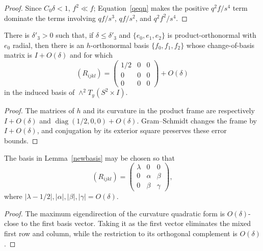 \begin{proof}
\sketch
Since $C_0\delta<1$, $f^2\ll f$; Equation~\eqref{qeqn} makes the positive
$q^2f/s^4$ term dominate the terms involving $qf/s^3$, $qf/s^2$, and
$q^2f^2/s^4$.
\end{proof}

\begin{lemma}
\label{lem:near-cylinder-curvature-eigenbasis}
\label{newbasis}
There is $\delta'_3>0$ such that, if $\delta\leq\delta'_3$ and
$\{e_0,e_1,e_2\}$ is product-orthonormal with $e_0$ radial, then there is an
$h$-orthonormal basis $\{f_0,f_1,f_2\}$ whose change-of-basis matrix is
$I+O(\delta)$ and for which
\[
  (R_{ijkl})=
  \begin{pmatrix}1/2&0&0\\0&0&0\\0&0&0\end{pmatrix}+O(\delta)
\]
in the induced basis of $\wedge^2T_y(S^2\times I)$.
\end{lemma}

\begin{proof}
\sketch
The matrices of $h$ and its curvature in the product frame are respectively
$I+O(\delta)$ and
$\operatorname{diag}(1/2,0,0)+O(\delta)$. Gram--Schmidt changes the frame by
$I+O(\delta)$, and conjugation by its exterior square preserves these error
bounds.
\end{proof}

\begin{corollary}
\label{cor:curvature-diagonal-block-basis}

\label{2ndnewbasis}
The basis in Lemma~\ref{newbasis} may be chosen so that
\[
  (R_{ijkl})=
  \begin{pmatrix}\lambda&0&0\\0&\alpha&\beta\\0&\beta&\gamma\end{pmatrix},
\]
where
$|\lambda-1/2|,|\alpha|,|\beta|,|\gamma|=O(\delta)$.
\end{corollary}

\begin{proof}
\sketch
The maximum eigendirection of the curvature quadratic form is
$O(\delta)$-close to the first basis vector. Taking it as the first vector
eliminates the mixed first row and column, while the restriction to its
orthogonal complement is $O(\delta)$.
\end{proof}

